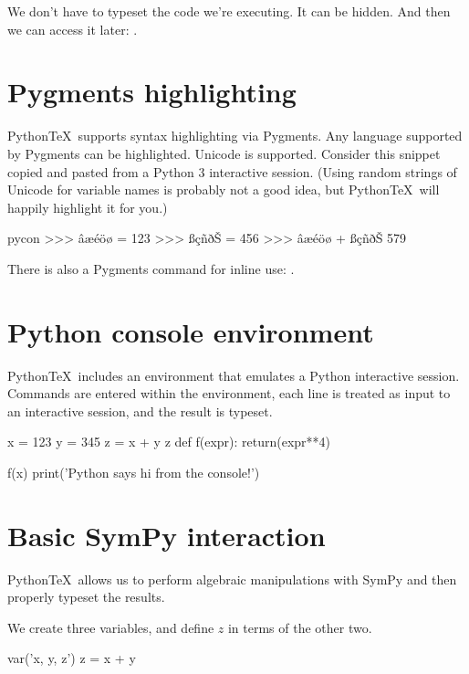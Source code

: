 \documentclass[11pt]{article}
\newcommand{\pytex}{Python\TeX}
\begin{document}
We don't have to typeset the code we're executing.  It can be hidden.  And then we can access it later:  .


\section{Pygments highlighting}

\pytex\ supports syntax highlighting via Pygments.  Any language supported by Pygments can be highlighted.  Unicode is supported.  Consider this snippet copied and pasted from a Python 3 interactive session.  (Using random strings of Unicode for variable names is probably not a good idea, but \pytex\ will happily highlight it for you.)

\begin{pygments}{pycon}
>>> âæéöø = 123
>>> ßçñðŠ = 456
>>> âæéöø + ßçñðŠ
579
\end{pygments}

There is also a Pygments command for inline use:  .




\section{Python console environment}

\pytex\ includes an environment that emulates a Python interactive session.  Commands are entered within the environment, each line is treated as input to an interactive session, and the result is typeset.

\begin{pyconsole}[][frame=single]
x = 123
y = 345
z = x + y
z
def f(expr):
    return(expr**4)

f(x)
print('Python says hi from the console!')
\end{pyconsole}


\section{Basic SymPy interaction}

\pytex\ allows us to perform algebraic manipulations with SymPy and then properly typeset the results.

We create three variables, and define $z$ in terms of the other two.

\begin{sympyblock}
var('x, y, z')
z = x + y
\end{sympyblock}
\end{document}
